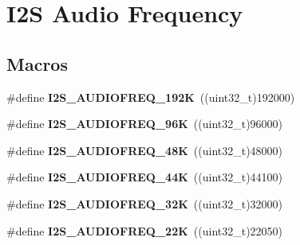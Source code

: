\hypertarget{group___i2_s___audio___frequency}{}\section{I2S Audio Frequency}
\label{group___i2_s___audio___frequency}
\subsection*{Macros}
\begin{DoxyCompactItemize}
\item 
\#define {\bfseries I2\+S\+\_\+\+A\+U\+D\+I\+O\+F\+R\+E\+Q\+\_\+192K}~((uint32\+\_\+t)192000)\hypertarget{group___i2_s___audio___frequency_ga835e684fdb326d62c1cfc8d4b8fde944}{}\label{group___i2_s___audio___frequency_ga835e684fdb326d62c1cfc8d4b8fde944}

\item 
\#define {\bfseries I2\+S\+\_\+\+A\+U\+D\+I\+O\+F\+R\+E\+Q\+\_\+96K}~((uint32\+\_\+t)96000)\hypertarget{group___i2_s___audio___frequency_ga0b51976937c47ce42db565ec053ce80b}{}\label{group___i2_s___audio___frequency_ga0b51976937c47ce42db565ec053ce80b}

\item 
\#define {\bfseries I2\+S\+\_\+\+A\+U\+D\+I\+O\+F\+R\+E\+Q\+\_\+48K}~((uint32\+\_\+t)48000)\hypertarget{group___i2_s___audio___frequency_ga7e33aad8b5089783d2d73771c8bd8c30}{}\label{group___i2_s___audio___frequency_ga7e33aad8b5089783d2d73771c8bd8c30}

\item 
\#define {\bfseries I2\+S\+\_\+\+A\+U\+D\+I\+O\+F\+R\+E\+Q\+\_\+44K}~((uint32\+\_\+t)44100)\hypertarget{group___i2_s___audio___frequency_ga62c764ebc2037c6a394909a899e1d3c3}{}\label{group___i2_s___audio___frequency_ga62c764ebc2037c6a394909a899e1d3c3}

\item 
\#define {\bfseries I2\+S\+\_\+\+A\+U\+D\+I\+O\+F\+R\+E\+Q\+\_\+32K}~((uint32\+\_\+t)32000)\hypertarget{group___i2_s___audio___frequency_ga64bb1c92ca88c0cbf102bba816f796a5}{}\label{group___i2_s___audio___frequency_ga64bb1c92ca88c0cbf102bba816f796a5}

\item 
\#define {\bfseries I2\+S\+\_\+\+A\+U\+D\+I\+O\+F\+R\+E\+Q\+\_\+22K}~((uint32\+\_\+t)22050)\hypertarget{group___i2_s___audio___frequency_gaec6b3447020cbf5234ac36c53474c9b5}{}\label{group___i2_s___audio___frequency_gaec6b3447020cbf5234ac36c53474c9b5}


\end{DoxyCompactItemize}
